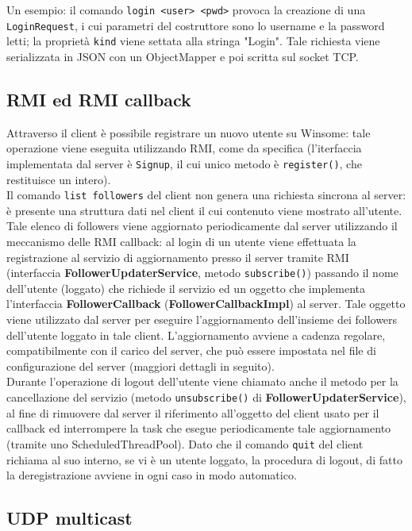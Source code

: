 Un esempio: il comando \verb|login <user> <pwd>| provoca la creazione di una \verb|LoginRequest|,
i cui parametri del costruttore sono lo username e la password letti; la proprietà \verb|kind| viene settata alla stringa "Login".
Tale richiesta viene serializzata in JSON con un ObjectMapper e poi scritta sul socket TCP.\\

 \subsection{RMI ed RMI callback}
Attraverso il client è possibile registrare un nuovo utente su Winsome: tale operazione 
viene eseguita utilizzando RMI, come da specifica (l'iterfaccia implementata dal server è \verb|Signup|, 
il cui unico metodo è \verb|register()|, che restituisce un intero).\\

 Il comando \verb|list followers| del client non genera una richiesta sincrona al server: 
 è presente una struttura dati nel client il cui contenuto viene mostrato all'utente. 
 Tale elenco di followers viene aggiornato periodicamente dal server utilizzando il meccanismo 
 delle RMI callback: al login di un utente viene effettuata la registrazione al servizio di aggiornamento presso il server 
 tramite RMI (interfaccia \textbf{FollowerUpdaterService}, metodo \verb|subscribe()|) passando il nome dell'utente 
 (loggato) che richiede il servizio ed un oggetto che implementa l'interfaccia \textbf{FollowerCallback} 
 (\textbf{FollowerCallbackImpl}) al server. Tale oggetto viene utilizzato dal server per eseguire 
 l'aggiornamento dell'insieme dei followers dell'utente loggato in tale client.
 L'aggiornamento avviene a cadenza regolare, compatibilmente con il carico del server, che può essere
 impostata nel file di configurazione del server (maggiori dettagli in seguito).\\
 Durante l'operazione di logout dell'utente viene chiamato anche il metodo per la cancellazione
 del servizio (metodo \verb|unsubscribe()| di \textbf{FollowerUpdaterService}), al fine di rimuovere
 dal server il riferimento all'oggetto del client usato per il callback ed interrompere la task
 che esegue periodicamente tale aggiornamento (tramite uno ScheduledThreadPool). Dato che il comando
 \verb|quit| del client richiama al suo interno, se vi è un utente loggato, la procedura di logout,
 di fatto la deregistrazione avviene in ogni caso in modo automatico.\\

\subsection{UDP multicast}